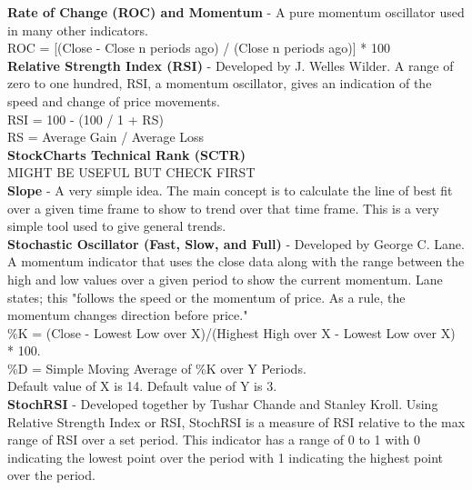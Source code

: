 \documentclass[12pt,a4paper]{article}
\begin{document}
\textbf{Rate of Change (ROC) and Momentum} - A pure momentum oscillator used in many other indicators.\\

ROC = [(Close - Close n periods ago) / (Close n periods ago)] * 100 \\

\iffalse
[]
\fi

\textbf{Relative Strength Index (RSI)} - Developed by J. Welles Wilder. A range of zero to one hundred, RSI, a momentum oscillator, gives an indication of the speed and change of price movements.\\

RSI = 100 - (100 / 1 + RS) \\
RS = Average Gain / Average Loss\\

\iffalse
[]
\fi

\textbf{StockCharts Technical Rank (SCTR)} \\

MIGHT BE USEFUL BUT CHECK FIRST\\

\iffalse
[]
\fi

\textbf{Slope} - A very simple idea. The main concept is to calculate the line of best fit over a given time frame to show to trend over that time frame. This is a very simple tool used to give general trends.\\

\iffalse
[]
\fi

\textbf{Stochastic Oscillator (Fast, Slow, and Full)} - Developed by George C. Lane. A momentum indicator that uses the close data along with the range between the high and low values over a given period to show the current momentum. Lane states; this "follows the speed or the momentum of price. As a rule, the momentum changes direction before price." \\

\%K = (Close - Lowest Low over X)/(Highest High over X - Lowest Low over X) * 100.\\
\%D = Simple Moving Average of \%K over Y Periods. \\
Default value of X is 14. Default value of Y is 3.\\

\iffalse
[]
\fi

\textbf{StochRSI} - Developed together by Tushar Chande and Stanley Kroll. Using Relative Strength Index or RSI, StochRSI is a measure of RSI relative to the max range of RSI over a set period. This indicator has a range of 0 to 1 with 0 indicating the lowest point over the period with 1 indicating the highest point over the period.\\
\end{document}
